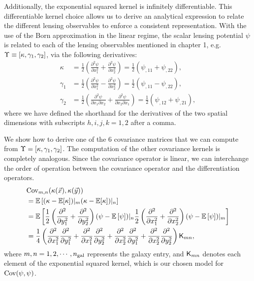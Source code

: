 Additionally, the exponential squared kernel is infinitely differentiable. This
differentiable kernel choice allows us to derive an analytical expression to
relate the different lensing observables to enforce a consistent representation.  
With the use of the Born approximation in the linear regime, the scalar lensing potential $\psi$ is related to 
each of the lensing observables mentioned in chapter 1, e.g. 
$\Upsilon \equiv [\kappa, \gamma_1, \gamma_2]$, via the following derivatives:
\begin{align}
\kappa &= \frac{1}{2}\left(\frac{\partial^2 \psi}{\partial x_1^2} +
\frac{\partial^2 \psi}{\partial x_2^2 }\right) 
= \frac{1}{2} (\psi_{,11} + \psi_{,22}),\\ 
\gamma_1 
&=\frac{1}{2}\left(\frac{\partial^2 \psi}{\partial x_1^2} - 
\frac{\partial^2 \psi}{\partial x_2^2}\right) 
= \frac{1}{2} (\psi_{,11} - \psi_{,22}), \\
\gamma_2 
&=\frac{1}{2}\left(\frac{\partial^2 \psi}{\partial x_1 \partial
x_2} + \frac{\partial^2 \psi}{\partial x_2 \partial x_1}\right)
= \frac{1}{2} (\psi_{,12} + \psi_{,21}),
\end{align}
where we have defined the shorthand for the derivatives of the two spatial dimensions with
subscripts $h,i,j,k = 1, 2$ after a comma.

We show how to derive one of the 6  covariance matrices that we can compute
from $\Upsilon = [\kappa, \gamma_1, \gamma_2]$. The computation of the other
covariance kernels is completely analogous.
Since the covariance operator is linear, we can interchange the order of
operation between the covariance operator and the differentiation operators. 
\begin{align*}
&{\rm Cov}_{m,n} (\kappa(\vec{x}), \kappa(\vec{y}))  \\ 
&= \mathbb{E} \left[ 
	(\kappa - \mathbb{E}[\kappa])|_m 
( \kappa - \mathbb{E}[\kappa])|_n\right] 
\\
 &=\mathbb{E}\left[
\frac{1}{2} \left(\frac{\partial^2}{\partial y_1^2} + 
\frac{\partial^2}{\partial y_2^2}\right) 
 (\psi - \mathbb{E}\left[\psi\right])|_n \frac{1}{2}
\left(\frac{\partial^2}{\partial x_1^2} + \frac{\partial^2}{\partial x_2^2} \right)
(\psi - \mathbb{E}\left[\psi\right])|_m \right]
\\
&= \frac{1}{4}\left(
\frac{\partial^2}{\partial x_1^2} \frac{\partial^2}{\partial y_1^2} + 
\frac{\partial^2}{\partial x_1^2} \frac{\partial^2}{\partial y_2^2} +  
\frac{\partial^2}{\partial x_2^2} \frac{\partial^2}{\partial y_1^2} + 
\frac{\partial^2}{\partial x_2^2} \frac{\partial^2}{\partial y_2^2}  
\right) \mathsf{K}_{mn},\\ 
\end{align*}
where $m, n = 1, 2, \cdots, n_{\rm gal}$ represents the galaxy entry, and  
$\mathsf{K}_{mn}$ denotes each element of the exponential squared kernel,
which is our chosen model for $\mathrm{Cov}(\psi, \psi)$.

